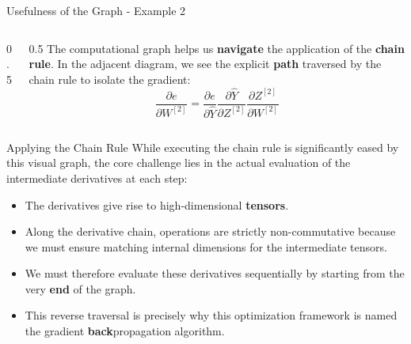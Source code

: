 \begin{frame}{Usefulness of the Graph - Example 2}
\begin{columns}
\begin{column}{0.5\textwidth}
\begin{center}
{\begin{tikzpicture}
					\end{tikzpicture}
				}
			\end{center}
		\end{column}
		\begin{column}{0.5\textwidth}
			The computational graph helps us \textbf{navigate} the application of the \textbf{chain rule}. In the adjacent diagram, we see the explicit \textbf{path} traversed by the chain rule to isolate the gradient:
			\begin{equation*}
				\frac{\partial{e}}{\partial{W^{[2]}}} = \frac{\partial{e}}{\partial{\hat{Y}}} \frac{\partial{\hat{Y}}}{\partial{Z^{[2]}}} \frac{\partial{Z^{[2]}}}{\partial{W^{[2]}}}
			\end{equation*}
		\end{column}
	\end{columns}
\end{frame}

\begin{frame}{Applying the Chain Rule}
	While executing the chain rule is significantly eased by this visual graph, the core challenge lies in the actual evaluation of the intermediate derivatives at each step:
	\begin{itemize}
		\pause
		\item The derivatives give rise to high-dimensional \textbf{tensors}.
		\pause
		\item Along the derivative chain, operations are strictly non-commutative because we must ensure matching internal dimensions for the intermediate tensors.
		\pause
		\item We must therefore evaluate these derivatives sequentially by starting from the very \textbf{end} of the graph.
		\pause
		\item This reverse traversal is precisely why this optimization framework is named the gradient \textbf{back}propagation algorithm.
	\end{itemize}
\end{frame}

